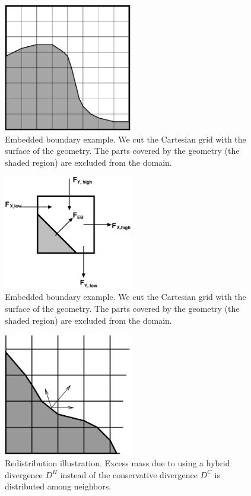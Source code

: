 \begin{figure}[p]
  \centering
  \includegraphics[width=0.5\textwidth]{./EB/EB_example.pdf}
\caption{\label{fig::ebexample}Embedded boundary example.   We cut the
  Cartesian grid with the surface of the geometry.  The parts covered
  by the geometry (the shaded region) are excluded from the domain.}
\end{figure}

\begin{figure}[p]
  \centering
  \includegraphics[width=0.5\textwidth]{./EB/eb_fluxes.pdf}
\caption{\label{fig::eb_fluxes}Embedded boundary example.   We cut the
  Cartesian grid with the surface of the geometry.  The parts covered
  by the geometry (the shaded region) are excluded from the domain.}
\end{figure}

\begin{figure}[p]
  \centering
  \includegraphics[width=0.5\textwidth]{./EB/redist.pdf}
\caption{\label{fig::redistribution}
Redistribution illustration.  Excess mass due to using a hybrid
divergence $D^H$ instead of the conservative divergence $D^C$ is
distributed among neighbors.}
\end{figure}

